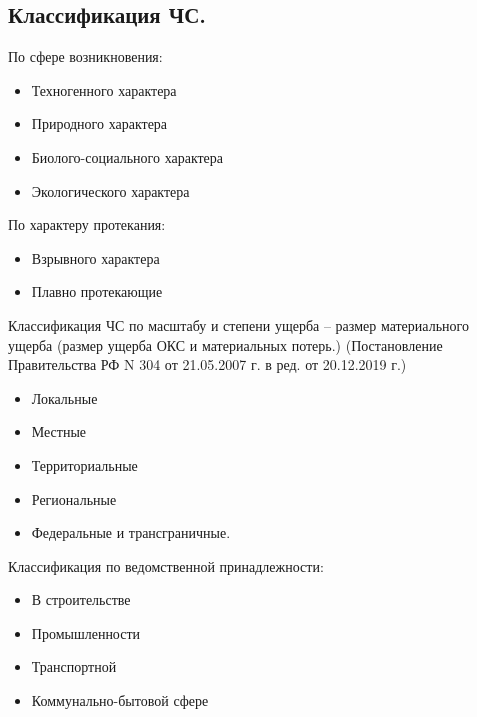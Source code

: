 \documentclass[a4paper, 12pt]{article}
\theoremstyle{definition}
\begin{document}
        \subsection{Классификация ЧС.}
        По сфере возникновения: 
        \begin{itemize}
            \item Техногенного характера
            \item Природного характера 
            \item Биолого-социального характера
            \item Экологического характера
        \end{itemize} 
        По характеру протекания:
        \begin{itemize}
            \item Взрывного характера
            \item Плавно протекающие
        \end{itemize}
        Классификация ЧС по масштабу и степени ущерба -- размер материального ущерба (размер ущерба ОКС и материальных потерь.) (Постановление Правительства РФ N 304 от 21.05.2007 г. в ред. от 20.12.2019 г.)
        \begin{itemize}
            \item Локальные
            \item Местные
            \item Территориальные
            \item Региональные
            \item Федеральные и трансграничные.
        \end{itemize}
        Классификация по ведомственной принадлежности:
        \begin{itemize}
            \item В строительстве
            \item Промышленности
            \item Транспортной
            \item Коммунально-бытовой сфере
        \end{itemize}
\end{document}
